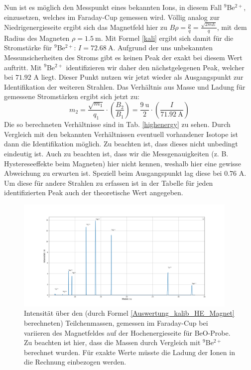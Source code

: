 Nun ist es möglich den Messpunkt eines bekannten Ions, in diesem Fall $^{9}$Be$^{2+}$, einzusetzen, welches im Faraday-Cup gemessen wird.
Völlig analog zur Niedrigenergieseite ergibt sich das Magnetfeld hier zu $B \rho = \frac{p}{q} = \frac{\sqrt{2mE}}{q}$, mit dem Radius des Magneten $\rho = \SI{1.5}{\metre}$.
Mit Formel \ref{kali} ergibt sich damit für die Stromstärke für $^{9}$Be$^{2+}$: $I = \SI{72.68}{\ampere}$.
Aufgrund der uns unbekannten Messunsicherheiten des Stroms gibt es keinen Peak der exakt bei diesem Wert auftritt.
Mit $^{9}$Be$^{2+}$ identifizieren wir daher den nächstgelegenen Peak, welcher bei $\num{71.92}$ A liegt.
Dieser Punkt nutzen wir jetzt wieder als Ausgangspunkt zur Identifikation der weiteren Strahlen.
Das Verhältnis aus Masse und Ladung für gemessene Stromstärken ergibt sich jetzt zu:
\begin{equation}
m_2 = \frac{\sqrt{m_1}}{q_1} \cdot \left( \frac{B_2}{B_1} \right) = \frac{\SI{9}{\atomicmassunit}}{2} \cdot \left( \frac{I}{\SI{71.92}{\ampere}} \right)
\label{Auswertung_kalib_HE_Magnet}
\end{equation}
Die so berechneten Verhältnisse sind in Tab. \ref{highenergy} zu sehen.
Durch Vergleich mit den bekannten Verhältnissen eventuell vorhandener Isotope ist dann die Identifikation möglich.
Zu beachten ist, dass dieses nicht unbedingt eindeutig ist.
Auch zu beachten ist, dass wir die Messgenauigkeiten (z. B. Hystereseeffekte beim Magneten) hier nicht kennen, weshalb hier eine gewisse Abweichung zu erwarten ist.
Speziell beim Ausgangspunkt lag diese bei $\num{0.76}$ A.
Um diese für andere Strahlen zu erfassen ist in der Tabelle für jeden identifizierten Peak auch der theoretische Wert angegeben.

\begin{figure}[H]
	\centering
    \includegraphics[width=0.95\textwidth]{Pictures/HEMass60-140pos153BeOTUDPract.png}
	\caption{Intensität über den (durch Formel \ref{Auswertung_kalib_HE_Magnet} berechneten) Teilchenmassen, gemessen im Faraday-Cup bei variieren des Magnetfeldes auf der Hochenergieseite für BeO-Probe. Zu beachten ist hier, dass die Massen durch Vergleich mit $^{9}$Be$^{2+}$ berechnet wurden. Für exakte Werte müsste die Ladung der Ionen in die Rechnung einbezogen werden.}
	\label{Auswertung_Bild_Faraday_Cup_BeO_HE}
\end{figure}

